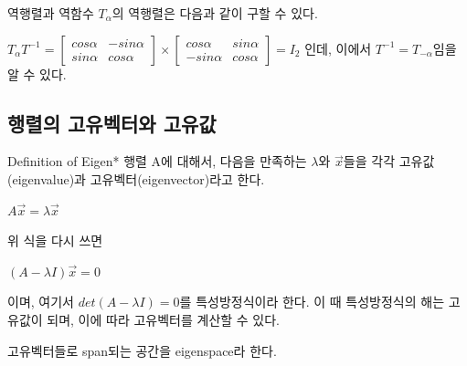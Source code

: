 \documentclass{beamer}
\begin{document}
\begin{frame}{역행렬과 역함수} 
$T_{\alpha}$의 역행렬은 다음과 같이 구할 수 있다. 

$T_{\alpha} T^{-1}  = 
\left[ \begin{matrix}
cos \alpha & - sin \alpha  \\
sin \alpha & cos \alpha 
\end{matrix} \right] \times 
\left[ \begin{matrix}
cos \alpha & sin \alpha \\
- sin \alpha & cos \alpha
\end{matrix} \right] = I_2
$
인데, 이에서 $T^{-1} = T_{-\alpha}$임을 알 수 있다. 

\end{frame}


\subsection{행렬의 고유벡터와 고유값}


\begin{frame}{Definition of Eigen*} 
행렬 A에 대해서, 다음을 만족하는 $\lambda$와 $\vec{x}$들을 각각 고유값(eigenvalue)과 고유벡터(eigenvector)라고 한다. 

$ A \vec{x} = \lambda \vec{x}$ 

위 식을 다시 쓰면 

$ (A-\lambda I) \vec{x} = 0 $ 

이며, 여기서 $det(A-\lambda I)=0$를 특성방정식이라 한다. 이 때 특성방정식의 해는 고유값이 되며, 이에 따라 고유벡터를 계산할 수 있다. 

고유벡터들로 span되는 공간을 eigenspace라 한다. 
\end{frame}
\end{document}
